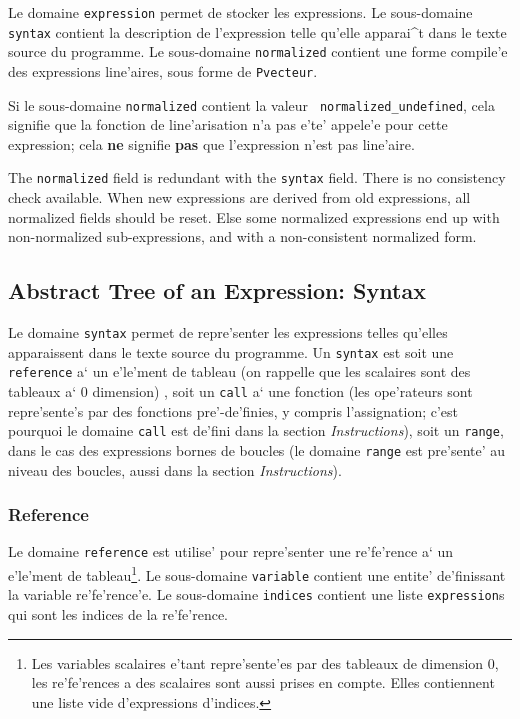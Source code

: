 {}

Le domaine \verb/expression/ permet de stocker les expressions.  Le
sous-domaine {\tt syntax} contient la description de l'expression telle
qu'elle apparai^t dans le texte source du programme. Le sous-domaine
{\tt normalized} contient une forme compile'e des expressions
line'aires, sous forme de \verb/Pvecteur/.

Si le sous-domaine {\tt normalized} contient la valeur {\tt
normalized\_undefined}, cela signifie que la fonction de line'arisation
n'a pas e'te' appele'e pour cette expression; cela {\bf ne} signifie
{\bf pas} que l'expression n'est pas line'aire.

The \verb/normalized/ field is redundant with the \verb/syntax/
field. There is no consistency check available. When new expressions are
derived from old expressions, all normalized fields should be
reset. Else some normalized expressions end up with non-normalized
sub-expressions, and with a non-consistent normalized form.


\subsection{Abstract Tree of an Expression: Syntax}
\label{subsection-syntax}

{}

Le domaine \verb/syntax/ permet de repre'senter les expressions telles
qu'elles apparaissent dans le texte source du programme. Un
\verb/syntax/ est soit une \verb/reference/ a` un e'le'ment de tableau
(on rappelle que les scalaires sont des tableaux a` 0 dimension) , soit
un \verb/call/ a` une fonction (les ope'rateurs sont repre'sente's par
des fonctions pre'-de'finies, y compris l'assignation; c'est pourquoi le
domaine {\tt call} est de'fini dans la section {\em Instructions}), soit
un \verb/range/, dans le cas des expressions bornes de boucles (le domaine
{\tt range} est pre'sente' au niveau des boucles, aussi dans la section
{\em Instructions}).


\subsubsection{Reference}
\label{subsubsection-reference}

{
Le domaine \verb/reference/ est utilise' pour repre'senter une
re'fe'rence a` un e'le'ment de tableau\footnote{Les variables scalaires
e'tant repre'sente'es par des tableaux de dimension 0, les re'fe'rences
a des scalaires sont aussi prises en compte. Elles contiennent une liste
vide d'expressions d'indices.}.  Le sous-domaine \verb/variable/
contient une entite' de'finissant la variable re'fe'rence'e. Le
sous-domaine \verb/indices/ contient une liste {\tt expression}s qui sont les
indices de la re'fe'rence.
}

